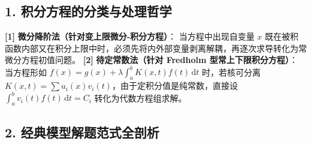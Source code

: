 \documentclass[11pt,a4paper,UTF8]{ctexart}
\begin{document}
\subsection{1. 积分方程的分类与处理哲学}
\begin{solbox}[分步推导与答题规范]
\textbf{[1]}  \textbf{微分降阶法（针对变上限微分-积分方程）}：
当方程中出现自变量 $x$ 既在被积函数内部又在积分上限中时，必须先将内外部变量剥离解耦，再逐次求导转化为常微分方程初值问题。
\textbf{[2]}  \textbf{待定常数法（针对 Fredholm 型常上下限积分方程）}：
当方程形如 $f(x) = g(x) + \lambda \int_a^b K(x, t)f(t)\,\mathrm{d}t$ 时，若核可分离 $K(x, t) = \sum u_i(x)v_i(t)$，由于定积分值是纯常数，直接设 $\int_a^b v_i(t)f(t)\,\mathrm{d}t = C_i$ 转化为代数方程组求解。
\end{solbox}


\subsection{2. 经典模型解题范式全剖析}
\end{document}
